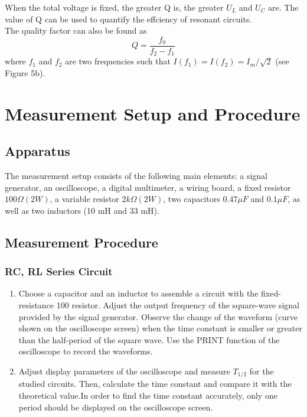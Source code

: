 \documentclass{article}
\begin{document}
When the total voltage is fixed, the greater Q is, the greater $ U_L $ and $ U_C $ are. The value of Q can be used to quantify the effciency of resonant circuits.\\

The quality factor can also be found as
$$ Q=\dfrac{f_0}{f_2-f_1} $$
where $ f_1 $ and $ f_2 $ are two frequencies such that $ I(f_1) = I(f_2) = I_m/\sqrt{2} $ (see Figure 5b).

\section{Measurement Setup and Procedure}

\subsection{Apparatus}
The measurement setup consists of the following main elements: a signal generator, an oscilloscope, a digital multimeter, a wiring board, a fixed resistor $ 100\Omega (2 W) $, a variable resistor $ 2 k\Omega(2 W) $, two capacitors $ 0.47 \mu F $ and $ 0.1 \mu F $, as well as two inductors (10 mH and 33 mH).

\subsection{Measurement Procedure}
\subsubsection{RC, RL Series Circuit}

\begin{enumerate}
\item 
Choose a capacitor and an inductor to assemble a circuit with the fixed-resistance 100 resistor. Adjust the output frequency of the square-wave signal provided by the signal generator. Observe the change of the waveform (curve shown on the oscilloscope screen) when the time constant is smaller or greater than the half-period of the square wave. Use the PRINT function of the oscilloscope to record the waveforms.
\item 
Adjust display parameters of the oscilloscope and measure $ T_{1/2} $ for the studied circuits. Then, calculate the time constant and compare it with the theoretical value.In order to find the time constant accurately, only one period should be displayed on the oscilloscope screen.
\end{enumerate}
\end{document}
